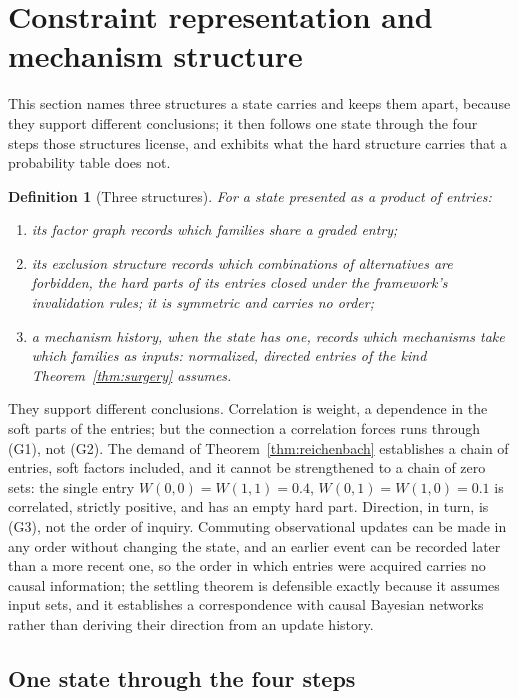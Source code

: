 \documentclass[11pt]{article}
\newtheorem{definition}{Definition}
\begin{document}
\section{Constraint representation and mechanism structure}\label{sec:rerendition}

This section names three structures a state carries and keeps them apart, because they support different conclusions; it then follows one state through the four steps those structures license, and exhibits what the hard structure carries that a probability table does not.

\begin{definition}[Three structures]\label{def:structures}
For a state presented as a product of entries:
\begin{enumerate}
\item[(G1)] its \emph{factor graph} records which families share a graded entry;
\item[(G2)] its \emph{exclusion structure} records which combinations of alternatives are forbidden, the hard parts of its entries closed under the framework's invalidation rules; it is symmetric and carries no order;
\item[(G3)] a \emph{mechanism history}, when the state has one, records which mechanisms take which families as inputs: normalized, directed entries of the kind Theorem~\ref{thm:surgery} assumes.
\end{enumerate}
\end{definition}

\noindent They support different conclusions. Correlation is weight, a dependence in the soft parts of the entries; but the connection a correlation forces runs through (G1), not (G2). The demand of Theorem~\ref{thm:reichenbach} establishes a chain of entries, soft factors included, and it cannot be strengthened to a chain of zero sets: the single entry $W(0,0) = W(1,1) = 0.4$, $W(0,1) = W(1,0) = 0.1$ is correlated, strictly positive, and has an empty hard part. Direction, in turn, is (G3), not the order of inquiry. Commuting observational updates can be made in any order without changing the state, and an earlier event can be recorded later than a more recent one, so the order in which entries were acquired carries no causal information; the settling theorem is defensible exactly because it assumes input sets, and it establishes a correspondence with causal Bayesian networks rather than deriving their direction from an update history.

\subsection{One state through the four steps}\label{sec:worked}
\end{document}

